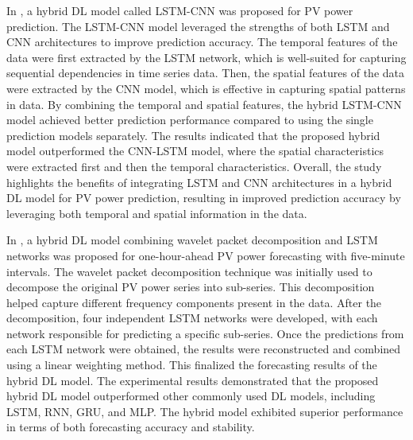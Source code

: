 In \cite{WANG2019116225}, a hybrid DL model called LSTM-CNN was proposed for PV power prediction.
The LSTM-CNN model leveraged the strengths of both LSTM and CNN architectures to improve prediction accuracy.
The temporal features of the data were first extracted by the LSTM network, which is well-suited for capturing sequential dependencies in time series data.
Then, the spatial features of the data were extracted by the CNN model, which is effective in capturing spatial patterns in data.
By combining the temporal and spatial features, the hybrid LSTM-CNN model achieved better prediction performance compared to using the single prediction models separately.
The results indicated that the proposed hybrid model outperformed the CNN-LSTM model, where the spatial characteristics were extracted first and then the temporal characteristics.
Overall, the study highlights the benefits of integrating LSTM and CNN architectures in a hybrid DL model for PV power prediction, resulting in improved prediction accuracy by leveraging both temporal and spatial information in the data.

In \cite{LI2020114216}, a hybrid DL model combining wavelet packet decomposition and LSTM networks was proposed for one-hour-ahead PV power forecasting with five-minute intervals.
The wavelet packet decomposition technique was initially used to decompose the original PV power series into sub-series.
This decomposition helped capture different frequency components present in the data.
After the decomposition, four independent LSTM networks were developed, with each network responsible for predicting a specific sub-series.
Once the predictions from each LSTM network were obtained, the results were reconstructed and combined using a linear weighting method.
This finalized the forecasting results of the hybrid DL model.
The experimental results demonstrated that the proposed hybrid DL model outperformed other commonly used DL models, including LSTM, RNN, GRU, and MLP.
The hybrid model exhibited superior performance in terms of both forecasting accuracy and stability.

